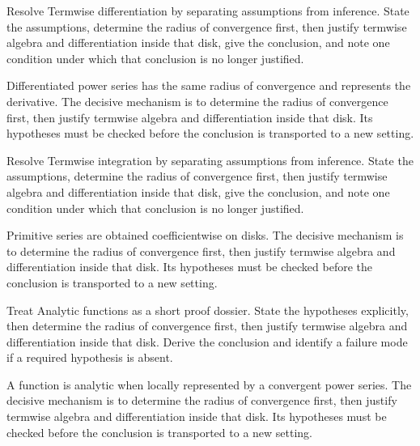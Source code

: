 \begin{problem}\label{prob:iv03-problem-04}
Resolve Termwise differentiation by separating assumptions from inference. State the assumptions, determine the radius of convergence first, then justify termwise algebra and differentiation inside that disk, give the conclusion, and note one condition under which that conclusion is no longer justified.
\end{problem}
\begin{solution}
Differentiated power series has the same radius of convergence and represents the derivative. The decisive mechanism is to determine the radius of convergence first, then justify termwise algebra and differentiation inside that disk. Its hypotheses must be checked before the conclusion is transported to a new setting.
\end{solution}

\begin{problem}\label{prob:iv03-problem-05}
Resolve Termwise integration by separating assumptions from inference. State the assumptions, determine the radius of convergence first, then justify termwise algebra and differentiation inside that disk, give the conclusion, and note one condition under which that conclusion is no longer justified.
\end{problem}
\begin{solution}
Primitive series are obtained coefficientwise on disks. The decisive mechanism is to determine the radius of convergence first, then justify termwise algebra and differentiation inside that disk. Its hypotheses must be checked before the conclusion is transported to a new setting.
\end{solution}

\begin{problem}\label{prob:iv03-problem-06}
Treat Analytic functions as a short proof dossier. State the hypotheses explicitly, then determine the radius of convergence first, then justify termwise algebra and differentiation inside that disk. Derive the conclusion and identify a failure mode if a required hypothesis is absent.
\end{problem}
\begin{solution}
A function is analytic when locally represented by a convergent power series. The decisive mechanism is to determine the radius of convergence first, then justify termwise algebra and differentiation inside that disk. Its hypotheses must be checked before the conclusion is transported to a new setting.
\end{solution}

